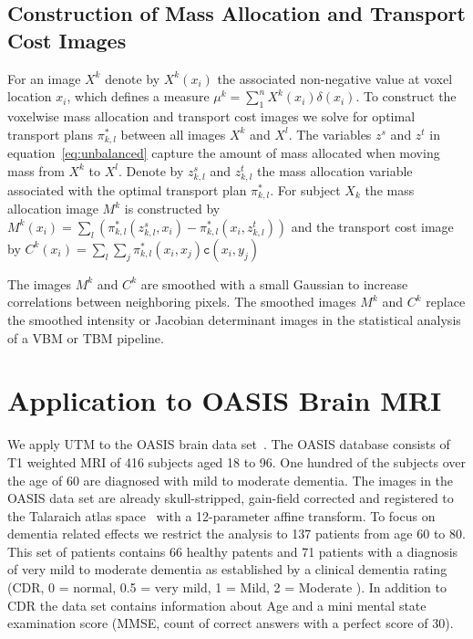 \documentclass{llncs}
\newcommand{\cost}[0]{\mathtt{c}}
\newcommand{\coupling}[0]{\pi}
\begin{document}
\subsection{Construction of Mass Allocation and Transport Cost Images}
\label{sec:mass}
For an image $X^k$ denote by $X^k(x_i)$ the associated non-negative value at
voxel location $x_i$, which defines a measure $\mu^k = \sum_1^n X^k(x_i)
\delta(x_i)$.  To construct the voxelwise mass allocation and transport cost
images we solve for optimal transport plans $\coupling^*_{k,l}$ between all
images $X^k$ and $X^l$.  The variables $z^s$ and $z^t$ in
equation~\ref{eq:unbalanced} capture the amount of mass allocated when moving
mass from $X^k$ to $X^l$. Denote by $z^s_{k, l}$ and $z^t_{k,l}$ the mass
allocation variable associated with the optimal transport plan
$\coupling^*_{k,l}$. For subject $X_k$ the mass allocation image $M^k$ is
constructed by 
$
M^k(x_i) = \sum_l \left( 
  \coupling^*_{k,l}( z^s_{k, l}, x_i) - 
  \coupling^*_{k,l}( x_i, z^t_{k, l} ) 
\right)
$ 
and the transport cost image by 
$C^k(x_i) = \sum_l \sum_j \coupling^*_{k,l}( x_i, x_j ) \cost(x_i, y_j)$

The images $M^k$ and $C^k$ are smoothed with a small Gaussian to increase
correlations between neighboring pixels. The smoothed images $M^k$ and $C^k$
replace the smoothed intensity or Jacobian determinant images in the
statistical analysis of a VBM or TBM pipeline. 


\section{Application to OASIS Brain MRI}
\label{sec:results}
We apply UTM to the OASIS brain data set~\cite{marcus2010open}. The OASIS
database consists of T1 weighted MRI of 416 subjects aged 18 to 96. One hundred
of the subjects over the age of 60 are diagnosed with mild to moderate
dementia. The images in the OASIS data set are already skull-stripped,
gain-field corrected and registered to the Talaraich atlas
space~\cite{talaraich:book88} with a 12-parameter affine transform.  To focus
on dementia related effects we restrict the analysis to 137 patients from age
60 to 80. This set of patients contains 66 healthy patents and 71 patients with
a diagnosis of very mild to moderate dementia as established by a clinical
dementia rating (CDR, 0 = normal, 0.5 = very mild, 1 = Mild, 2 = Moderate ). In
addition to CDR the data set contains information about Age and a mini mental
state examination score (MMSE, count of correct answers with a perfect score of
30).
\end{document}
